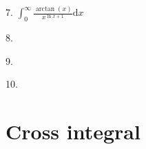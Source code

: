 \documentclass{article}
\newcommand{\dd}{\mathrm{d}}
\begin{document}
7. $\int_0^{\infty} \frac{\arctan(x)}{x^{\ln{x}+1}} \dd x$ \newline \newline  \newline 

8.

9.

10.

\section{Cross integral}










\end{document}
